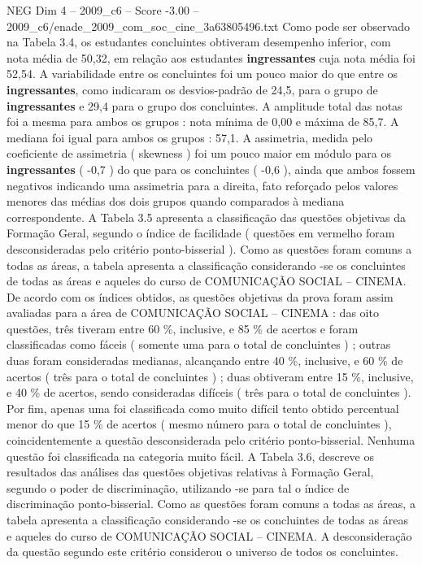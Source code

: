 \begin{textsample}{NEG Dim 4 – 2009\_c6 – Score -3.00 – 2009\_c6/enade\_2009\_com\_soc\_cine\_3a63805496.txt}
Como pode ser observado na Tabela 3.4, os estudantes concluintes obtiveram desempenho inferior, com nota média de 50,32, em relação aos estudantes \textbf{ingressantes} cuja nota média foi 52,54.
A variabilidade entre os concluintes foi um pouco maior do que entre os \textbf{ingressantes}, como indicaram os desvios-padrão de 24,5, para o grupo de \textbf{ingressantes} e 29,4 para o grupo dos concluintes.
A amplitude total das notas foi a mesma para ambos os grupos : nota mínima de 0,00 e máxima de 85,7.
A mediana foi igual para ambos os grupos : 57,1.
A assimetria, medida pelo coeficiente de assimetria ( skewness ) foi um pouco maior em módulo para os \textbf{ingressantes} ( -0,7 ) do que para os concluintes ( -0,6 ), ainda que ambos fossem negativos indicando uma assimetria para a direita, fato reforçado pelos valores menores das médias dos dois grupos quando comparados à mediana correspondente.
A Tabela 3.5 apresenta a classificação das questões objetivas da Formação Geral, segundo o índice de facilidade ( questões em vermelho foram desconsideradas pelo critério ponto-bisserial ).
Como as questões foram comuns a todas as áreas, a tabela apresenta a classificação considerando -se os concluintes de todas as áreas e aqueles do curso de COMUNICAÇÃO SOCIAL – CINEMA.
De acordo com os índices obtidos, as questões objetivas da prova foram assim avaliadas para a área de COMUNICAÇÃO SOCIAL – CINEMA : das oito questões, três tiveram entre 60 \%, inclusive, e 85 \% de acertos e foram classificadas como fáceis ( somente uma para o total de concluintes ) ; outras duas foram consideradas medianas, alcançando entre 40 \%, inclusive, e 60 \% de acertos ( três para o total de concluintes ) ; duas obtiveram entre 15 \%, inclusive, e 40 \% de acertos, sendo consideradas difíceis ( três para o total de concluintes ).
Por fim, apenas uma foi classificada como muito difícil tento obtido percentual menor do que 15 \% de acertos ( mesmo número para o total de concluintes ), coincidentemente a questão desconsiderada pelo critério ponto-bisserial.
Nenhuma questão foi classificada na categoria muito fácil.
A Tabela 3.6, descreve os resultados das análises das questões objetivas relativas à Formação Geral, segundo o poder de discriminação, utilizando -se para tal o índice de discriminação ponto-bisserial.
Como as questões foram comuns a todas as áreas, a tabela apresenta a classificação considerando -se os concluintes de todas as áreas e aqueles do curso de COMUNICAÇÃO SOCIAL – CINEMA.
A desconsideração da questão segundo este critério considerou o universo de todos os concluintes.

\end{textsample}
